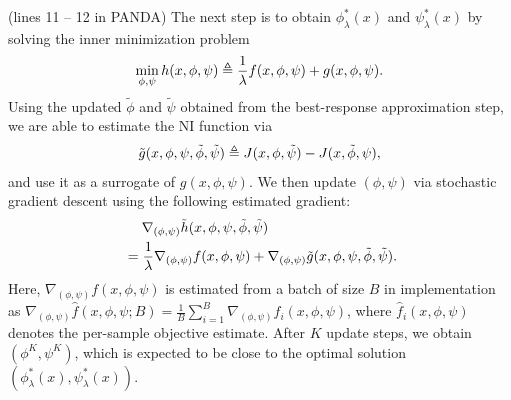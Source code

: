\documentclass{article}
\theoremstyle{plain}
\theoremstyle{definition}
\theoremstyle{remark}
\def\bydef{\triangleq}
\begin{document}



 (lines 11 -- 12 in PANDA)
The next step is to obtain $\phi_\lambda^*(x)$ and $\psi_\lambda^*(x)$ by solving the inner minimization problem
\vspace{-1mm}
\begin{align}
    \min_{\phi,\psi} h(x,\phi,\psi) \bydef \frac{1}{\lambda} f(x,\phi,\psi) +  g(x,\phi,\psi) \label{eq: problem-inner-minimization}.
    \vspace{-2mm}
\end{align}
Using the updated $\tilde{\phi}$ and $\tilde{\psi}$ obtained from the best-response approximation step, we are able to estimate the NI function via
\begin{align}
    \tilde{g}(x,\phi,\psi,\tilde{\phi},\tilde{\psi}) \bydef J(x,\phi,\tilde{\psi}) - J(x,\tilde{\phi},\psi),
    \vspace{-2mm}
\end{align}
and use it as a surrogate of $g(x,\phi,\psi)$. We then update $(\phi,\psi)$ via stochastic gradient descent using the following estimated gradient:
\vspace{-1mm}
\begin{align}
    &\quad\; \nabla_{(\phi,\psi)} \tilde{h}(x,\phi,\psi,\tilde{\phi},\tilde{\psi}) \notag \\
    & =  \frac{1}{\lambda} \nabla_{(\phi,\psi)} f(x,\phi,\psi)  + \nabla_{(\phi,\psi)} \tilde{g}(x,\phi,\psi,\tilde{\phi},\tilde{\psi}).  
    \vspace{-2mm}
\end{align}
Here, $\nabla_{(\phi,\psi)} f(x,\phi,\psi)$ is estimated from a batch of size $B$ in implementation as $\nabla_{(\phi,\psi)} \hat{f}(x,\phi,\psi;B) = \frac{1}{B}\sum_{i=1}^{B}\nabla_{(\phi,\psi)} \hat{f}_i(x,\phi,\psi)$, where $\hat{f}_i(x,\phi,\psi)$ denotes the per-sample objective estimate.
After $K$ update steps, we obtain $(\phi^K,\psi^K)$, which is expected to be close to the optimal solution $(\phi^*_\lambda(x),\psi^*_\lambda(x))$.
\end{document}
